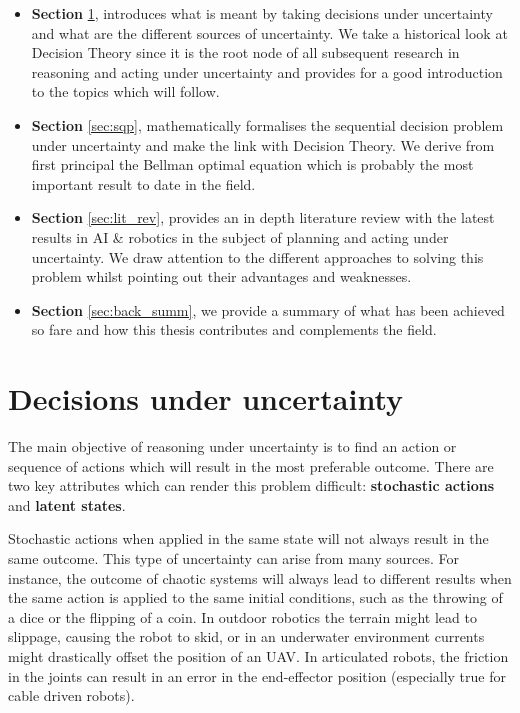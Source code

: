 \begin{itemize}
 \item \textbf{Section} \ref{sec:deci_un}, introduces what is meant by taking decisions under uncertainty and what are the different 
 sources of uncertainty. We take a historical look at Decision Theory since it is the root node of all subsequent research in reasoning 
 and acting under uncertainty and provides for a good introduction to the topics which will follow.  
 \item \textbf{Section} \ref{sec:sqp},  mathematically formalises the sequential decision problem under uncertainty and make the link 
with Decision Theory. We derive from first principal the Bellman optimal equation which is probably the most important result to 
date in the field.
 \item \textbf{Section} \ref{sec:lit_rev}, provides an in depth literature review with the latest results in AI \& robotics in the subject 
of planning and acting under uncertainty. We draw attention to the different approaches to solving this problem whilst pointing out
their advantages and weaknesses.
 \item \textbf{Section} \ref{sec:back_summ}, we provide a summary of what has been achieved so fare and how this thesis contributes and complements 
the field. 
\end{itemize}



\section{Decisions under uncertainty}\label{sec:deci_un}

The main objective of reasoning under uncertainty is to find an action or sequence of
actions which will result in the most preferable outcome. There are two key attributes which can render this 
problem difficult: \textbf{stochastic actions} and \textbf{latent states}. 

Stochastic actions when applied in the same state will not always result in the same outcome. This type of uncertainty 
can arise from many sources. For instance, the outcome of chaotic systems will always lead to different results when the same action is applied
to the same initial conditions, such as the throwing of a dice or the flipping of a coin. In outdoor robotics the terrain might lead to slippage, causing 
the robot to skid, or in an underwater environment currents might drastically offset the position of an UAV. In articulated robots, the friction in the joints 
can result in an error in the end-effector position (especially true for cable driven robots).

